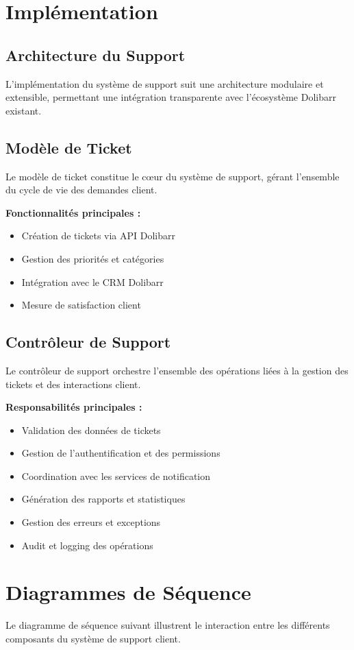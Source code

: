 \documentclass[12pt,a4paper]{report}
\begin{document}
\section{Implémentation}
\subsection{Architecture du Support}
L'implémentation du système de support suit une architecture modulaire et extensible, permettant une intégration transparente avec l'écosystème Dolibarr existant.

\subsection{Modèle de Ticket}
Le modèle de ticket constitue le cœur du système de support, gérant l'ensemble du cycle de vie des demandes client.

\textbf{Fonctionnalités principales :}
\begin{itemize}
\item Création de tickets via API Dolibarr
\item Gestion des priorités et catégories
\item Intégration avec le CRM Dolibarr
\item Mesure de satisfaction client
\end{itemize}

\subsection{Contrôleur de Support}
Le contrôleur de support orchestre l'ensemble des opérations liées à la gestion des tickets et des interactions client.

\textbf{Responsabilités principales :}
\begin{itemize}
\item Validation des données de tickets
\item Gestion de l'authentification et des permissions
\item Coordination avec les services de notification
\item Génération des rapports et statistiques
\item Gestion des erreurs et exceptions
\item Audit et logging des opérations
\end{itemize}



\section{Diagrammes de Séquence}
Le diagramme de séquence suivant illustrent le interaction entre les différents composants du système de support client.
\end{document}
